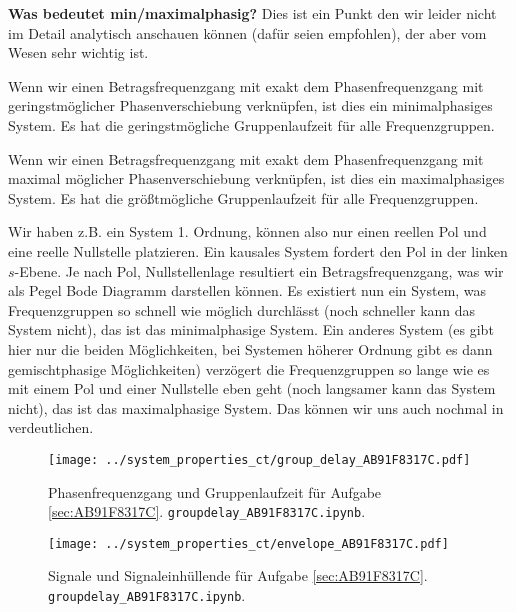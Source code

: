 \begin{mdframed}
\textbf{Was bedeutet min/maximalphasig?}
Dies ist ein Punkt den wir leider nicht im Detail analytisch anschauen können
(dafür seien \cite{LangeSigSys1, Fliege1991} empfohlen), der aber vom Wesen sehr
wichtig ist.

Wenn wir einen Betragsfrequenzgang mit exakt dem Phasenfrequenzgang
mit geringstmöglicher Phasenverschiebung verknüpfen, ist dies ein minimalphasiges
System. Es hat die geringstmögliche Gruppenlaufzeit für alle Frequenzgruppen.

Wenn wir einen Betragsfrequenzgang mit exakt dem Phasenfrequenzgang
mit maximal möglicher Phasenverschiebung verknüpfen, ist dies ein maximalphasiges
System. Es hat die größtmögliche Gruppenlaufzeit für alle Frequenzgruppen.

Wir haben z.B. ein System 1. Ordnung, können also nur einen reellen Pol und
eine reelle Nullstelle platzieren. Ein kausales System fordert den Pol in der linken
$s$-Ebene. Je nach Pol, Nullstellenlage resultiert ein Betragsfrequenzgang,
was wir als Pegel Bode Diagramm darstellen können.
Es existiert nun ein System, was Frequenzgruppen so schnell wie möglich durchlässt
(noch schneller kann das System nicht), das ist das minimalphasige System.
Ein anderes System (es gibt hier nur die beiden Möglichkeiten, bei Systemen
höherer Ordnung gibt es dann gemischtphasige Möglichkeiten)
verzögert die Frequenzgruppen so lange wie es mit einem Pol und einer
Nullstelle eben geht (noch langsamer kann das System nicht), das ist das maximalphasige
System.
Das können wir uns auch nochmal in 
verdeutlichen.

\end{mdframed}


\begin{figure}[h]
\centering
\texttt{[image: ../system\_properties\_ct/group\_delay\_AB91F8317C.pdf]}
\caption{Phasenfrequenzgang und Gruppenlaufzeit für Aufgabe \ref{sec:AB91F8317C}.
\texttt{groupdelay\_AB91F8317C.ipynb}.}
\label{fig:group_delay_AB91F8317C}
\end{figure}
%
%
%
\begin{figure}[h]
\centering
\texttt{[image: ../system\_properties\_ct/envelope\_AB91F8317C.pdf]}
\caption{Signale und Signaleinhüllende für Aufgabe \ref{sec:AB91F8317C}.
\texttt{groupdelay\_AB91F8317C.ipynb}.}
\label{fig:envelope_AB91F8317C}
\end{figure}
